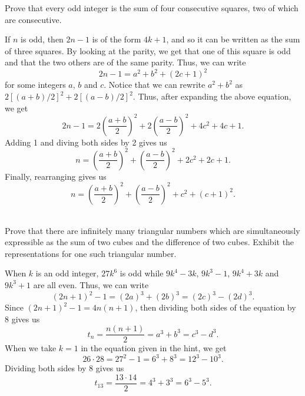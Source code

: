 \begin{exercise}
    Prove that every odd integer is the sum of four consecutive squares, two of which are consecutive.  \\
\end{exercise}

\begin{solution}
    If $n$ is odd, then $2n - 1$ is of the form $4k + 1$, and so it can be written as the sum of three squares. By looking at the parity, we get that one of this square is odd and that the two others are of the same parity. Thus, we can write
    $$2n - 1 = a^2 + b^2 + (2c + 1)^2$$
    for some integers $a$, $b$ and $c$. Notice that we can rewrite $a^2 + b^2$ as $2[(a+b)/2]^2 + 2[(a-b)/2]^2$. Thus, after expanding the above equation, we get
    $$2n - 1 = 2\left(\frac{a + b}{2}\right)^2 + 2\left(\frac{a - b}{2}\right)^2 + 4c^2 + 4c + 1.$$
    Adding 1 and diving both sides by 2 gives us
    $$n = \left(\frac{a + b}{2}\right)^2 + \left(\frac{a - b}{2}\right)^2 + 2c^2 + 2c + 1.$$
    Finally, rearranging gives us
    $$n = \left(\frac{a + b}{2}\right)^2 + \left(\frac{a - b}{2}\right)^2 + c^2 + (c+1)^2.$$ \\
\end{solution}

\begin{exercise}
    Prove that there are infinitely many triangular numbers which are simultaneously expressible as the sum of two cubes and the difference of two cubes. Exhibit the representations for one such triangular number.  \\
\end{exercise}

\begin{solution}
    When $k$ is an odd integer, $27k^6$ is odd while $9k^4 - 3k$, $9k^3 - 1$, $9k^4 + 3k$ and $9k^3 + 1$ are all even. Thus, we can write
    $$(2n + 1)^2 - 1 = (2a)^3 + (2b)^3 = (2c)^3 - (2d)^3.$$
    Since $(2n + 1)^2 - 1 = 4n(n + 1)$, then dividing both sides of the equation by 8 gives us
    $$t_n = \frac{n(n+1)}{2} = a^3 + b^3 = c^3 - d^3.$$
    When we take $k = 1$ in the equation given in the hint, we get
    $$26 \cdot 28 = 27^2 - 1 = 6^3 + 8^3 = 12^3 - 10^3.$$
    Dividing both sides by 8 gives us
    $$t_{13} = \frac{13\cdot 14}{2} = 4^3 + 3^3 = 6^3 - 5^3.$$ \\
\end{solution}

